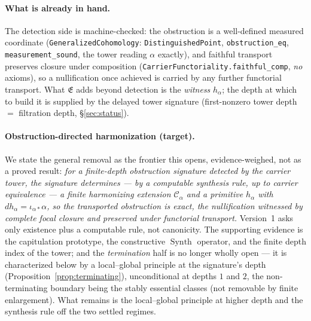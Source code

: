 \documentclass[11pt]{article}
\theoremstyle{definition}
\begin{document}
\paragraph{What is already in hand.} The detection side is machine-checked: the obstruction is a well-defined
measured coordinate (\texttt{GeneralizedCohomology}: \texttt{DistinguishedPoint}, \texttt{obstruction\_eq},
\texttt{measurement\_sound}, the tower reading $\alpha$ exactly), and faithful transport preserves closure under
composition (\texttt{CarrierFunctoriality.faithful\_comp}, \emph{no} axioms), so a nullification once achieved is
carried by any further functorial transport. What $\mathfrak E$ adds beyond detection is the \emph{witness}
$h_\alpha$; the depth at which to build it is supplied by the delayed tower signature (first-nonzero tower depth
$=$ filtration depth, \S\ref{sec:status}).

\paragraph{Obstruction-directed harmonization (target).} We state the general removal as the frontier this opens,
evidence-weighed, not as a proved result: \emph{for a finite-depth obstruction signature detected by the carrier
tower, the signature determines --- by a computable synthesis rule, up to carrier equivalence --- a finite
harmonizing extension $\mathcal C_\alpha$ and a primitive $h_\alpha$ with $d h_\alpha=\iota_{\alpha*}\alpha$, so
the transported obstruction is exact, the nullification witnessed by complete focal closure and preserved under
functorial transport.} Version~1 asks only existence plus a computable rule, not canonicity. The supporting
evidence is the capitulation prototype, the constructive $\operatorname{Synth}$ operator, and the finite depth
index of the tower; and the \emph{termination} half is no longer wholly open --- it is characterized below by a
local--global principle at the signature's depth (Proposition~\ref{prop:terminating}), unconditional at depths
$1$ and $2$, the non-terminating boundary being the stably essential classes (not removable by finite
enlargement). What remains is the local--global principle at higher depth and the synthesis rule off the two
settled regimes.
\end{document}
